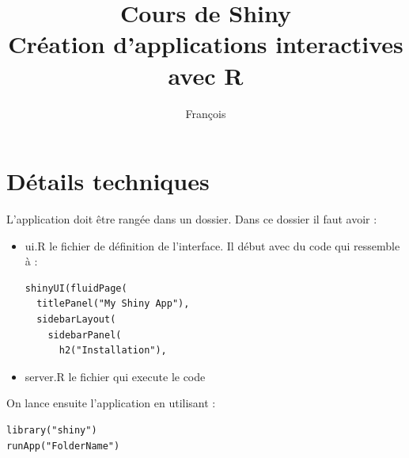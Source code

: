 \documentclass{article}
\begin{document}
\title{Cours de Shiny \\ Création d'applications interactives avec R}

\author{François}
\maketitle

\section{Détails techniques}
L'application doit être rangée dans un dossier. Dans ce dossier il faut avoir :\\
\begin{itemize}
\item
ui.R le fichier de définition de l'interface. Il début avec du code qui ressemble à : 
\begin{verbatim}
shinyUI(fluidPage(
  titlePanel("My Shiny App"),
  sidebarLayout(
    sidebarPanel(
      h2("Installation"),
\end{verbatim}
\item
server.R le fichier qui execute le code
\end{itemize}
On lance ensuite l'application en utilisant :
\begin{verbatim}
library("shiny")
runApp("FolderName")
\end{verbatim}
\end{document}
